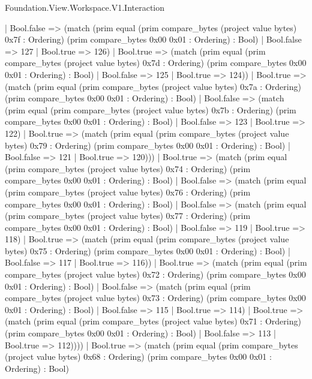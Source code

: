 \begin{lexlean}{Foundation.View.Workspace.V1.Interaction}
\begin{semanticmodule}
{                  | Bool.false => (match (prim equal (prim compare_bytes (project value bytes) 0x7f : Ordering) (prim compare_bytes 0x00 0x01 : Ordering) : Bool)
                    | Bool.false => 127
                    | Bool.true => 126)
                  | Bool.true => (match (prim equal (prim compare_bytes (project value bytes) 0x7d : Ordering) (prim compare_bytes 0x00 0x01 : Ordering) : Bool)
                    | Bool.false => 125
                    | Bool.true => 124))
                | Bool.true => (match (prim equal (prim compare_bytes (project value bytes) 0x7a : Ordering) (prim compare_bytes 0x00 0x01 : Ordering) : Bool)
                  | Bool.false => (match (prim equal (prim compare_bytes (project value bytes) 0x7b : Ordering) (prim compare_bytes 0x00 0x01 : Ordering) : Bool)
                    | Bool.false => 123
                    | Bool.true => 122)
                  | Bool.true => (match (prim equal (prim compare_bytes (project value bytes) 0x79 : Ordering) (prim compare_bytes 0x00 0x01 : Ordering) : Bool)
                    | Bool.false => 121
                    | Bool.true => 120)))
              | Bool.true => (match (prim equal (prim compare_bytes (project value bytes) 0x74 : Ordering) (prim compare_bytes 0x00 0x01 : Ordering) : Bool)
                | Bool.false => (match (prim equal (prim compare_bytes (project value bytes) 0x76 : Ordering) (prim compare_bytes 0x00 0x01 : Ordering) : Bool)
                  | Bool.false => (match (prim equal (prim compare_bytes (project value bytes) 0x77 : Ordering) (prim compare_bytes 0x00 0x01 : Ordering) : Bool)
                    | Bool.false => 119
                    | Bool.true => 118)
                  | Bool.true => (match (prim equal (prim compare_bytes (project value bytes) 0x75 : Ordering) (prim compare_bytes 0x00 0x01 : Ordering) : Bool)
                    | Bool.false => 117
                    | Bool.true => 116))
                | Bool.true => (match (prim equal (prim compare_bytes (project value bytes) 0x72 : Ordering) (prim compare_bytes 0x00 0x01 : Ordering) : Bool)
                  | Bool.false => (match (prim equal (prim compare_bytes (project value bytes) 0x73 : Ordering) (prim compare_bytes 0x00 0x01 : Ordering) : Bool)
                    | Bool.false => 115
                    | Bool.true => 114)
                  | Bool.true => (match (prim equal (prim compare_bytes (project value bytes) 0x71 : Ordering) (prim compare_bytes 0x00 0x01 : Ordering) : Bool)
                    | Bool.false => 113
                    | Bool.true => 112))))
            | Bool.true => (match (prim equal (prim compare_bytes (project value bytes) 0x68 : Ordering) (prim compare_bytes 0x00 0x01 : Ordering) : Bool)
}
\end{semanticmodule}
\end{lexlean}
